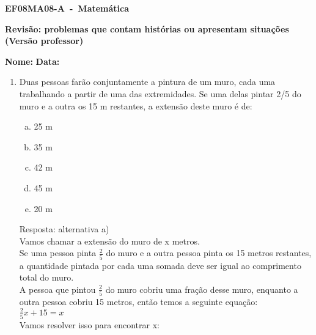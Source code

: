 \documentclass[a4paper,14pt]{article}
\begin{document}
	
	\noindent\textbf{EF08MA08-A~-~Matemática} 
	
	\begin{center}
		\textbf{Revisão: problemas que contam histórias ou apresentam situações (Versão professor)}
	\end{center}
	
	
	\noindent\textbf{Nome:} \underline{\hspace{10cm}}
    \noindent\textbf{Data:} \underline{\hspace{4cm}}
	
	
	\begin{multicols}{2}
	\begin{enumerate}	
		\item Duas pessoas farão conjuntamente a pintura de um muro, cada uma trabalhando a partir de uma das extremidades. Se uma delas pintar 2/5 do muro e a outra os 15 m restantes, a extensão deste muro é de: 
		\begin{enumerate}[a)]
			\item 25 m
			\item 35 m
			\item 42 m
			\item 45 m
			\item 20 m
	    \end{enumerate}
    
        Resposta: alternativa a) \\
        
        Vamos chamar a extensão do muro de x metros.\\
        
        Se uma pessoa pinta $\frac{2}{5}$ do muro e a outra pessoa pinta os 15 metros restantes, a quantidade pintada por cada uma somada deve ser igual ao comprimento total do muro.\\
        
        A pessoa que pintou $\frac{2}{5}$ do muro cobriu uma fração desse muro, enquanto a outra pessoa cobriu 
        15 metros, então temos a seguinte equação:\\
        
        $\frac{2}{5}x+15=x$\\
        
        Vamos resolver isso para encontrar x:\\
        

\end{enumerate}
\end{multicols}
\end{document}
